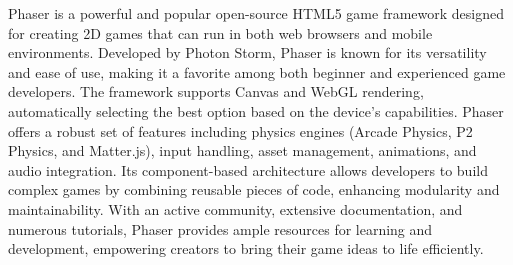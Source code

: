 Phaser is a powerful and popular open-source HTML5 game framework designed for creating 2D games that can run in both web browsers and mobile environments. Developed by Photon Storm, Phaser is known for its versatility and ease of use, making it a favorite among both beginner and experienced game developers. The framework supports Canvas and WebGL rendering, automatically selecting the best option based on the device's capabilities. Phaser offers a robust set of features including physics engines (Arcade Physics, P2 Physics, and Matter.js), input handling, asset management, animations, and audio integration. Its component-based architecture allows developers to build complex games by combining reusable pieces of code, enhancing modularity and maintainability. With an active community, extensive documentation, and numerous tutorials, Phaser provides ample resources for learning and development, empowering creators to bring their game ideas to life efficiently.
